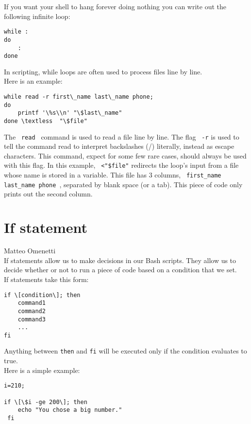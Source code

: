 \documentclass[hidelinks,12pt,a4paper,numbers=enddot]{scrartcl}
\begin{document}
If you want your shell to hang forever doing nothing you can write out the following infinite loop:
\begin{verbatim}
while :
do
    :
done
\end{verbatim}



In scripting, while loops are often used to process files line by line. \\
Here is an example:
\begin{verbatim}
while read -r first\_name last\_name phone;
do
    printf '\%s\\n' "\$last\_name"
done \textless  "\$file"
\end{verbatim}

The \texttt{ read } command is used to read a file line by line.
The flag \texttt{ -r} is used to tell the
command read to interpret backslashes (/) literally, instead as escape characters.
This command, expect for some few
rare cases, should always be used with this flag.
In this example, \texttt{ \textless  "\$file"} redirects the loop's input from a file
whose name is stored in a variable.
This file has 3 columns, \texttt{ first\_name last\_name phone }, separated by
blank space (or a tab).
This piece of code only prints out the second column.


\section{If statement}


\large Matteo Omenetti \normalsize\\




If statements allow us to make decisions in our Bash scripts. They allow us to
decide whether or not to run a piece of code based on a condition that we set. \\

If statements take this form:
\begin{verbatim}
if \[condition\]; then
    command1
    command2
    command3
    ...
fi
\end{verbatim}

Anything between \texttt{then} and \texttt{fi} will be executed only if the condition
evaluates to true. \\
Here is a simple example:

\begin{verbatim}
i=210;

if \[\$i -ge 200\]; then
    echo "You chose a big number."
 fi
\end{verbatim}
\end{document}
